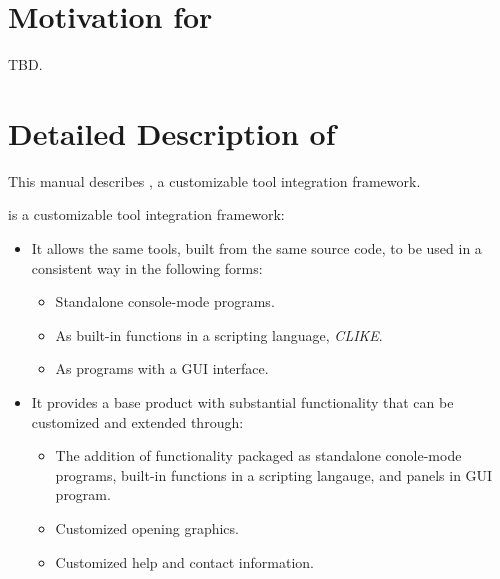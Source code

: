 \section{Motivation for \emph{\productname{}}}
\label{cint2:smfp0}

TBD.


\section{Detailed Description of \emph{\productname{}}}
\label{cint2:sddp0}

This manual describes \emph{\productname{}}, a customizable tool integration
framework.

\emph{\productname{}} is a customizable tool integration framework:
\begin{itemize}
      \item It allows the same tools, built from the same source code,
            to be used in a consistent way in the following forms:
            \begin{itemize}
                  \item Standalone console-mode programs.
                  \item As built-in functions in a scripting language, \emph{CLIKE}.
                  \item As programs with a GUI interface.
            \end{itemize}
      \item It provides a base product with substantial functionality that can be
            customized and extended through:
            \begin{itemize}
                \item The addition of functionality packaged as standalone conole-mode programs,
                      built-in functions in a scripting langauge, and panels in GUI
                      program.
                \item Customized opening graphics.
                \item Customized help and contact information.
          \end{itemize}
\end{itemize}

